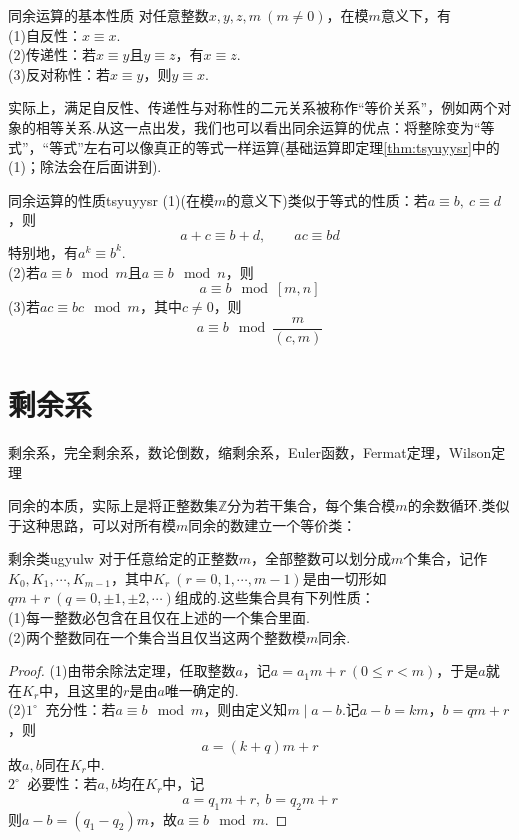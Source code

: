 \documentclass[lang=cn, zihao=5]{elegantbook}
\newcommand{\buzhou}[1]{$#1^{\circ} \ $}
\begin{document}
\begin{theorem}{同余运算的基本性质}
	对任意整数$x,y,z,m~(m \neq 0)$，在模$m$意义下，有 \\
	(1)自反性：$x \equiv x$. \\
	(2)传递性：若$x \equiv y$且$y \equiv z$，有$x \equiv z$. \\
	(3)反对称性：若$x \equiv y$，则$y \equiv x$.
\end{theorem}
\begin{remark}
	实际上，满足自反性、传递性与对称性的二元关系被称作“等价关系”，例如两个对象的相等关系.从这一点出发，我们也可以看出同余运算的优点：将整除变为“等式”，“等式”左右可以像真正的等式一样运算(基础运算即定理\ref{thm:tsyuyysr}中的(1)；除法会在后面讲到).
\end{remark}

\begin{theorem}{同余运算的性质}{tsyuyysr}
	(1)(在模$m$的意义下)类似于等式的性质：若$a \equiv b,~c \equiv d$，则$$a+c \equiv b+d, \qquad ac \equiv bd$$
	特别地，有$a^k \equiv b^k$. \\
	(2)若$a \equiv b \mod m$且$a \equiv b \mod n$，则$$a \equiv b \mod [m,n]$$
	(3)若$ac \equiv bc \mod m$，其中$c \neq 0$，则$$a \equiv b \mod \frac{m}{(c,m)}$$
\end{theorem}


\section{剩余系}

剩余系，完全剩余系，数论倒数，缩剩余系，Euler函数，Fermat定理，Wilson定理

同余的本质，实际上是将正整数集$\mathbb{Z}$分为若干集合，每个集合模$m$的余数循环.类似于这种思路，可以对所有模$m$同余的数建立一个等价类：

\begin{theorem}{剩余类}{ugyulw}
	对于任意给定的正整数$m$，全部整数可以划分成$m$个集合，记作$K_0,K_1, \cdots ,K_{m-1}$，其中$K_r~(r=0,1,\cdots ,m-1)$是由一切形如$qm+r~(q=0,\pm 1,\pm 2,\cdots )$组成的.这些集合具有下列性质： \\
	(1)每一整数必包含在且仅在上述的一个集合里面. \\
	(2)两个整数同在一个集合当且仅当这两个整数模$m$同余.
\end{theorem}
\begin{proof}
	(1)由带余除法定理，任取整数$a$，记$a=a_1m + r~(0 \leq r < m)$，于是$a$就在$K_r$中，且这里的$r$是由$a$唯一确定的. \\
	(2)\buzhou{1} 充分性：若$a \equiv b \mod m$，则由定义知$m \mid a-b$.记$a-b = km$，$b=qm + r$，则$$a = (k+q)m +r$$
	故$a,b$同在$K_r$中. \\
	\buzhou{2} 必要性：若$a,b$均在$K_r$中，记$$a=q_1m+r,~b=q_2m+r$$
	则$a-b = (q_1-q_2)m$，故$a \equiv b \mod m$.
\end{proof}
\end{document}
